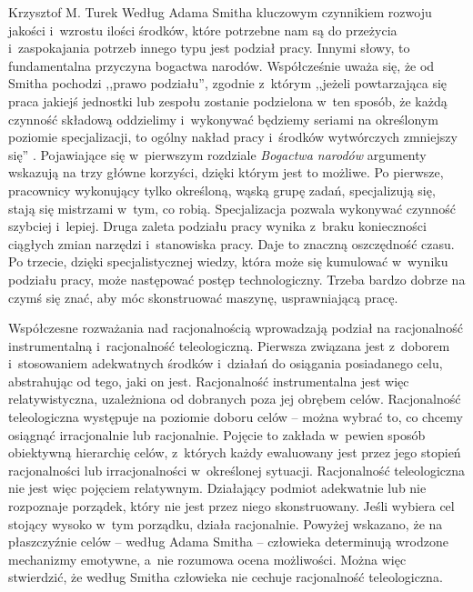 \begin{artplenv}{Krzysztof M. Turek}
Według Adama Smitha kluczowym czynnikiem rozwoju jakości i~wzrostu ilości środków, które potrzebne nam są do
przeżycia i~zaspokajania potrzeb innego typu jest podział pracy. Innymi słowy, to fundamentalna przyczyna bogactwa narodów.
Współcześnie uważa się, że od Smitha pochodzi ,,prawo podziału'', zgodnie z~którym ,,jeżeli powtarzająca się praca jakiejś
jednostki lub zespołu zostanie podzielona w~ten sposób, że każdą czynność składową oddzielimy i~wykonywać będziemy
seriami na określonym poziomie specjalizacji, to ogólny nakład pracy i~środków wytwórczych zmniejszy się''
\parencite{bielski_organizacje:_1997}.
Pojawiające się w~pierwszym rozdziale \textit{Bogactwa narodów} argumenty wskazują na
trzy główne korzyści, dzięki którym jest to możliwe. Po pierwsze, pracownicy wykonujący tylko określoną, wąską grupę
zadań, specjalizują się, stają się mistrzami w~tym, co robią. Specjalizacja pozwala wykonywać czynność
szybciej i~lepiej. Druga zaleta podziału pracy wynika z~braku konieczności ciągłych zmian narzędzi i~stanowiska pracy. Daje to
znaczną oszczędność czasu. Po trzecie, dzięki specjalistycznej wiedzy, która może się kumulować w~wyniku podziału
pracy, może następować postęp technologiczny. Trzeba bardzo dobrze na czymś się znać, aby móc skonstruować maszynę,
usprawniającą pracę.

Współczesne rozważania nad racjonalnością
\parencite[s.~12]{bochenek_problem_1999}
wprowadzają podział na
racjonalność instrumentalną i~racjonalność teleologiczną. Pierwsza związana jest z~doborem i~stosowaniem adekwatnych
środków i~działań do osiągania posiadanego celu, abstrahując od tego, jaki on jest. Racjonalność instrumentalna jest
więc relatywistyczna, uzależniona od dobranych poza jej obrębem celów. Racjonalność teleologiczna występuje na poziomie
doboru celów -- można wybrać to, co chcemy osiągnąć irracjonalnie lub racjonalnie. Pojęcie to zakłada w~pewien sposób
obiektywną hierarchię celów, z~których każdy ewaluowany jest przez jego stopień racjonalności lub
irracjonalności w~określonej sytuacji. Racjonalność teleologiczna nie jest więc pojęciem relatywnym.
Działający podmiot adekwatnie lub
nie rozpoznaje porządek, który nie jest przez niego skonstruowany. Jeśli wybiera cel stojący wysoko w~tym porządku, działa
racjonalnie. Powyżej wskazano, że na płaszczyźnie celów -- według Adama Smitha -- człowieka determinują wrodzone
mechanizmy emotywne, a~nie rozumowa ocena możliwości. Można więc stwierdzić, że według Smitha człowieka nie cechuje
racjonalność teleologiczna.


\end{artplenv}
